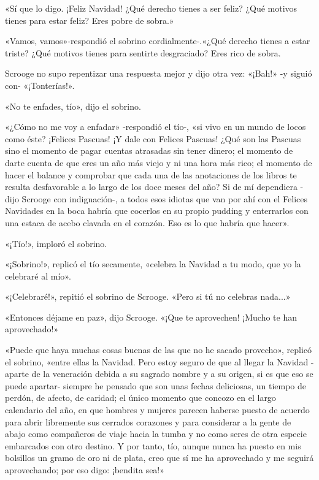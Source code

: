\documentclass{novela}
\begin{document}
 «Sí que lo digo. ¡Feliz Navidad! ¿Qué derecho tienes a ser feliz? ¿Qué motivos tienes para estar feliz? Eres pobre de sobra.»

 «Vamos, vamos»-respondió el sobrino cordialmente-.«¿Qué derecho tienes a estar triste? ¿Qué motivos tienes para sentirte desgraciado? Eres rico de sobra.

 Scrooge no supo repentizar una respuesta mejor y dijo otra vez: «¡Bah!» -y siguió con- «¡Tonterías!».

 «No te enfades, tío», dijo el sobrino.

 «¿Cómo no me voy a enfadar» -respondió el tío-, «si vivo en un mundo de locos como éste? ¡Felices Pascuas! ¡Y dale con Felices Pascuas! ¿Qué son las Pascuas sino el momento de pagar cuentas atrasadas sin tener dinero; el momento de darte cuenta de que eres un año más viejo y ni una hora más rico; el momento de hacer el balance y comprobar que cada una de las anotaciones de los libros te resulta desfavorable a lo largo de los doce meses del año? Si de mí dependiera -dijo Scrooge con indignación-, a todos esos idiotas que van por ahí con el Felices Navidades en la boca habría que cocerlos en su propio pudding y enterrarlos con una estaca de acebo clavada en el corazón. Eso es lo que habría que hacer».

 «¡Tío!», imploró el sobrino.

 «¡Sobrino!», replicó el tío secamente, «celebra la Navidad a tu modo, que yo la celebraré al mío».

 «¡Celebraré!», repitió el sobrino de Scrooge. «Pero si tú no celebras nada...»

 «Entonces déjame en paz», dijo Scrooge. «¡Que te aprovechen! ¡Mucho te han aprovechado!»

 «Puede que haya muchas cosas buenas de las que no he sacado provecho», replicó el sobrino, «entre ellas la Navidad. Pero estoy seguro de que al llegar la Navidad -aparte de la veneración debida a su sagrado nombre y a su origen, si es que eso se puede apartar- siempre he pensado que son unas fechas deliciosas, un tiempo de perdón, de afecto, de caridad; el único momento que concozo en el largo calendario del año, en que hombres y mujeres parecen haberse puesto de acuerdo para abrir libremente sus cerrados corazones y para considerar a la gente de abajo como compañeros de viaje hacia la tumba y no como seres de otra especie embarcados con otro destino. Y por tanto, tío, aunque nunca ha puesto en mis bolsillos un gramo de oro ni de plata, creo que sí me ha aprovechado y me seguirá aprovechando; por eso digo: ¡bendita sea!»
\end{document}

